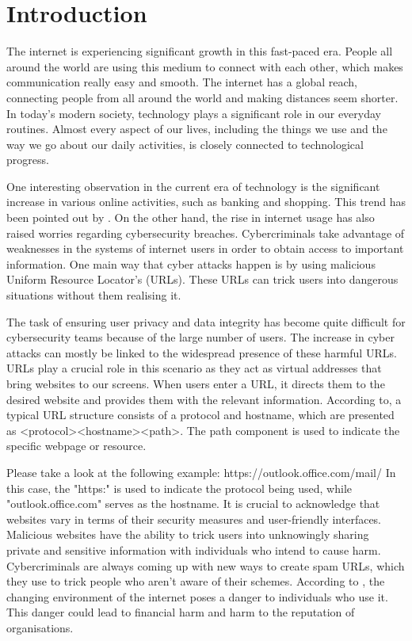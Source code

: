 
\chapter{Introduction}
The internet is experiencing significant growth in this fast-paced era. People all around the world are using this medium to connect with each other, which makes communication really easy and smooth. The internet has a global reach, connecting people from all around the world and making distances seem shorter. In today's modern society, technology plays a significant role in our everyday routines. Almost every aspect of our lives, including the things we use and the way we go about our daily activities, is closely connected to technological progress.

One interesting observation in the current era of technology is the significant increase in various online activities, such as banking and shopping. This trend has been pointed out by \cite{Aljabri2022DetectingMU}. On the other hand, the rise in internet usage has also raised worries regarding cybersecurity breaches. Cybercriminals take advantage of weaknesses in the systems of internet users in order to obtain access to important information. One main way that cyber attacks happen is by using malicious Uniform Resource Locator's (URLs). These URLs can trick users into dangerous situations without them realising it.

The task of ensuring user privacy and data integrity has become quite difficult for cybersecurity teams because of the large number of users. The increase in cyber attacks can mostly be linked to the widespread presence of these harmful URLs. URLs play a crucial role in this scenario as they act as virtual addresses that bring websites to our screens. When users enter a URL, it directs them to the desired website and provides them with the relevant information. According to\cite{Anjali}, a typical URL structure consists of a protocol and hostname, which are presented as <protocol><hostname><path>. The path component is used to indicate the specific webpage or resource.

Please take a look at the following example: https://outlook.office.com/mail/ In this case, the "https:" is used to indicate the protocol being used, while "outlook.office.com" serves as the hostname. It is crucial to acknowledge that websites vary in terms of their security measures and user-friendly interfaces. Malicious websites have the ability to trick users into unknowingly sharing private and sensitive information with individuals who intend to cause harm. Cybercriminals are always coming up with new ways to create spam URLs, which they use to trick people who aren't aware of their schemes. According to \cite{Aljabri2022DetectingMU}, the changing environment of the internet poses a danger to individuals who use it. This danger could lead to financial harm and harm to the reputation of organisations.


